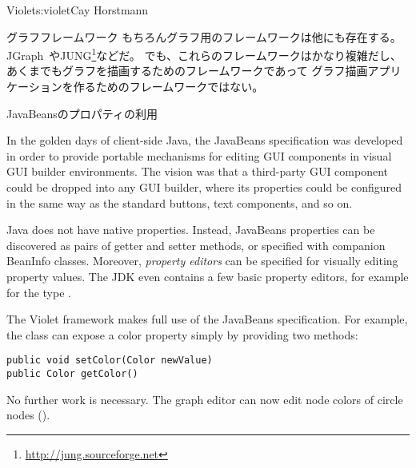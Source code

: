 \begin{aosachapter}{Violet}{s:violet}{Cay Horstmann}
\begin{aosasect1}{グラフフレームワーク}
もちろんグラフ用のフレームワークは他にも存在する。
JGraph~\cite{bib:alder:jgraph}やJUNG\footnote{\url{http://jung.sourceforge.net}}などだ。
でも、これらのフレームワークはかなり複雑だし、あくまでもグラフを描画するためのフレームワークであって
グラフ描画アプリケーションを作るためのフレームワークではない。

\end{aosasect1}

\begin{aosasect1}{JavaBeansのプロパティの利用}

In the golden days of client-side Java, the JavaBeans specification
was developed in order to provide portable mechanisms for editing GUI
components in visual GUI builder environments. The vision was that a
third-party GUI component could be dropped into any GUI builder, where
its properties could be configured in the same way as the standard
buttons, text components, and so on.

Java does not have native properties. Instead, JavaBeans properties
can be discovered as pairs of getter and setter methods, or specified
with companion BeanInfo classes. Moreover, \emph{property editors} can
be specified for visually editing property values. The JDK even
contains a few basic property editors, for example for the type
.

The Violet framework makes full use of the 
JavaBeans specification. For example, the  class can
expose a color property simply by providing two methods:

\begin{verbatim}
public void setColor(Color newValue)
public Color getColor()
\end{verbatim}

\noindent No further work is necessary. The graph editor can now edit node
colors of circle nodes ().



\end{aosasect1}
\end{aosachapter}
